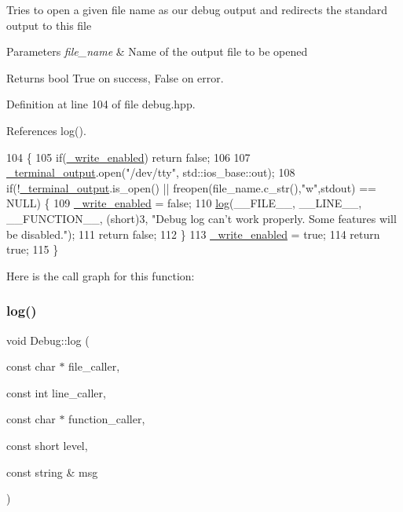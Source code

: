 Tries to open a given file name as our debug output and redirects the standard output to this file 
\begin{DoxyParams}{Parameters}
{\em file\+\_\+name} & Name of the output file to be opened \\
\hline
\end{DoxyParams}
\begin{DoxyReturn}{Returns}
bool True on success, False on error. 
\end{DoxyReturn}


Definition at line 104 of file debug.\+hpp.



References log().


\begin{DoxyCode}
104                                                    \{
105         \textcolor{keywordflow}{if}(\hyperlink{namespace_debug_a8657663a88aedee7162eadf1cb87f17e}{\_write\_enabled}) \textcolor{keywordflow}{return} \textcolor{keyword}{false};
106 
107         \hyperlink{namespace_debug_af5e1c2d16e9f59de038ca0f29dfc564a}{\_terminal\_output}.open(\textcolor{stringliteral}{"/dev/tty"}, std::ios\_base::out);
108         \textcolor{keywordflow}{if}(!\hyperlink{namespace_debug_af5e1c2d16e9f59de038ca0f29dfc564a}{\_terminal\_output}.is\_open() || freopen(file\_name.c\_str(),\textcolor{stringliteral}{"w"},stdout) == NULL) \{
109             \hyperlink{namespace_debug_a8657663a88aedee7162eadf1cb87f17e}{\_write\_enabled} = \textcolor{keyword}{false};
110             \hyperlink{namespace_debug_a243f3d5409b17837f6dae36f883f5cd1}{log}(\_\_FILE\_\_, \_\_LINE\_\_, \_\_FUNCTION\_\_, (\textcolor{keywordtype}{short})3, \textcolor{stringliteral}{"Debug log can't work properly. Some
       features will be disabled."});
111             \textcolor{keywordflow}{return} \textcolor{keyword}{false};
112         \}
113         \hyperlink{namespace_debug_a8657663a88aedee7162eadf1cb87f17e}{\_write\_enabled} = \textcolor{keyword}{true};
114         \textcolor{keywordflow}{return} \textcolor{keyword}{true};
115     \}
\end{DoxyCode}
Here is the call graph for this function\+:
\mbox{\label{namespace_debug_a243f3d5409b17837f6dae36f883f5cd1}} 
\subsubsection{\texorpdfstring{log()}{log()}}
{\footnotesize\ttfamily void Debug\+::log (\begin{DoxyParamCaption}\item[{const char $\ast$}]{file\+\_\+caller,  }\item[{const int}]{line\+\_\+caller,  }\item[{const char $\ast$}]{function\+\_\+caller,  }\item[{const short}]{level,  }\item[{const string \&}]{msg }\end{DoxyParamCaption})\hspace{0.3cm}{\ttfamily [inline]}}

